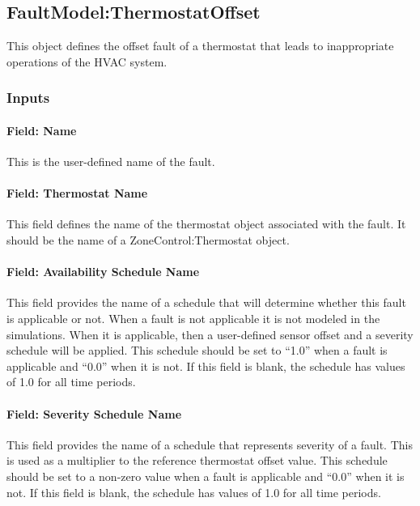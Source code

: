 \subsection{FaultModel:ThermostatOffset}\label{faultmodelthermostatoffset}

This object defines the offset fault of a thermostat that leads to inappropriate operations of the HVAC system.

\subsubsection{Inputs}\label{inputs-6-015}

\paragraph{Field: Name}\label{field-name-6-012}

This is the user-defined name of the fault.

\paragraph{Field: Thermostat Name}\label{field-thermostat-name}

This field defines the name of the thermostat object associated with the fault. It should be the name of a ZoneControl:Thermostat object.

\paragraph{Field: Availability Schedule Name}\label{field-availability-schedule-name-6-002}

This field provides the name of a schedule that will determine whether this fault is applicable or not. When a fault is not applicable it is not modeled in the simulations. When it is applicable, then a user-defined sensor offset and a severity schedule will be applied. This schedule should be set to ``1.0'' when a fault is applicable and ``0.0'' when it is not. If this field is blank, the schedule has values of 1.0 for all time periods.

\paragraph{Field: Severity Schedule Name}\label{field-severity-schedule-name-6}

This field provides the name of a schedule that represents severity of a fault. This is used as a multiplier to the reference thermostat offset value. This schedule should be set to a non-zero value when a fault is applicable and ``0.0'' when it is not. If this field is blank, the schedule has values of 1.0 for all time periods.

